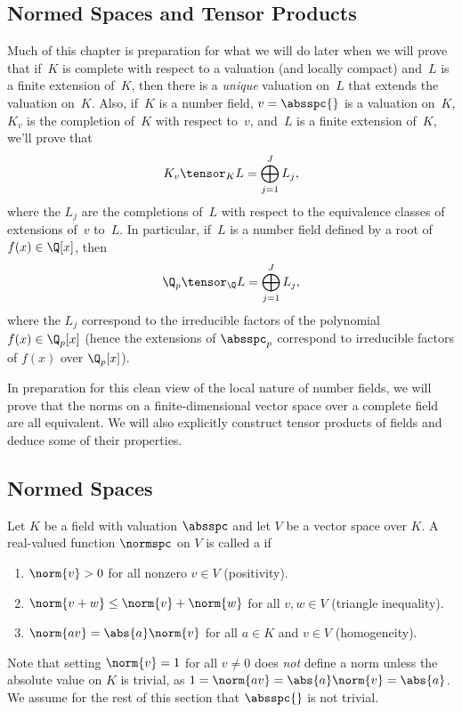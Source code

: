\documentclass[11pt]{book}
\begin{document}
\begin{ch}
\chapter{Normed Spaces and Tensor Products}
Much of this chapter is preparation for what we will do later
when we will prove that if~$K$ is complete with respect to a valuation
(and locally compact) and~$L$ is a finite extension of~$K$, then there
is a {\em unique} valuation on~$L$ that extends the valuation on~$K$.
Also, if~$K$ is a number field, $v=\absspc{}$ is a valuation on~$K$,
$K_v$ is the completion of~$K$ with respect to~$v$, and~$L$ is a
finite extension of~$K$, we'll prove that
$$
 K_v \tensor_K L   = \bigoplus_{j=1}^J L_j,
$$
 where the $L_j$ are the completions of~$L$ with respect to the
 equivalence classes of extensions of~$v$ to~$L$.  In particular,
 if~$L$ is a number field defined by a root of $f(x)\in \Q[x]$, then
$$
  \Q_p  \tensor_\Q  L = \bigoplus_{j=1}^J L_j,
$$
 where the $L_j$ correspond to the irreducible factors of
 the polynomial $f(x) \in \Q_p[x]$ (hence the extensions of
$\absspc_p$ correspond to irreducible factors of $f(x)$
over $\Q_p[x]$).

In preparation for this clean view of the local nature of number
fields, we will prove that the norms on a finite-dimensional
vector space over a complete field are all equivalent.  We will also
explicitly construct tensor products of fields and deduce some of
their properties.

\section{Normed Spaces}
\begin{definition}[Norm]\label{defn:norm}
Let $K$ be a field with valuation $\absspc$ and let $V$ be a vector space
over $K$.  A real-valued function $\normspc$ on $V$ is called a  if
\begin{enumerate}
\item $\norm{v}>0$ for all nonzero $v\in V$ (positivity).
\item $\norm{v+w} \leq \norm{v} + \norm{w}$ for all $v,w\in V$ (triangle inequality).
\item $\norm{av} = \abs{a}\norm{v}$ for all $a\in K$ and $v\in V$ (homogeneity).
\end{enumerate}
\end{definition}
Note that setting $\norm{v}=1$ for all $v\neq 0$ does {\em not} define
a norm unless the absolute value on $K$ is trivial, as $1=\norm{av} =
\abs{a}\norm{v}=\abs{a}$.  We assume for the rest of this section
that $\absspc{}$ is not trivial.


\end{ch}
\end{document}
